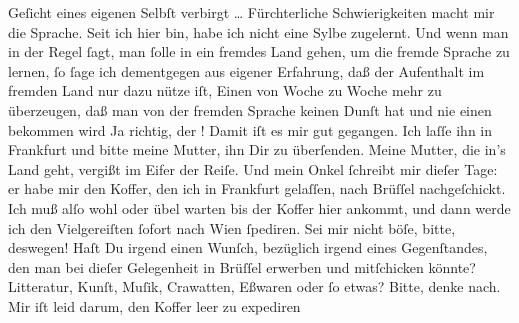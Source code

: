 \begin{ledgroupsized}[t]{13cm}
               Geſicht eines eigenen Selbſt verbirgt {\dots} Fürchterliche
               Schwierigkeiten macht mir die Sprache. Seit ich hier bin, habe ich nicht eine Sylbe
               zugelernt. Und wenn man in der Regel ſagt, man ſolle in ein fremdes Land gehen, um
               die fremde Sprache zu lernen, ſo ſage ich dementgegen aus eigener Erfahrung, daß der
               Aufenthalt im fremden Land nur dazu nütze iſt, Einen von Woche zu Woche mehr zu
               überzeugen, daß man von der fremden Sprache keinen Dunſt hat und nie einen bekommen
                  wird{\dotsfour}\pend
           \pstart
           Ja richtig, der \label{K_L02664-9v}\label{K_L02664-9h}! Damit iſt
               es mir gut gegangen. Ich laſſe ihn in Frankfurt
               und bitte meine Mutter, ihn
               Dir zu überſenden. Meine Mutter, die in’s Land geht, vergißt im Eifer der Reiſe. Und mein Onkel ſchreibt mir dieſer
               Tage: er habe mir den Koffer, den ich in Frankfurt gelaſſen, nach Brüſſel
               nachgeſchickt. Ich muß alſo wohl oder übel warten {\pb}bis der Koffer hier ankommt, und dann werde ich den Vielgereiſten ſofort nach Wien ſpediren. Sei mir nicht böſe, bitte, deswegen!
               Haſt Du irgend einen Wunſch, bezüglich irgend eines Gegenſtandes, den man bei dieſer
               Gelegenheit in Brüſſel erwerben und mitſchicken
               könnte? Litteratur, Kunſt, Muſik, Crawatten, Eßwaren oder ſo etwas? Bitte, denke
               nach. Mir iſt leid darum, den Koffer leer zu expediren{\dotsfour}\pend

\end{ledgroupsized}
